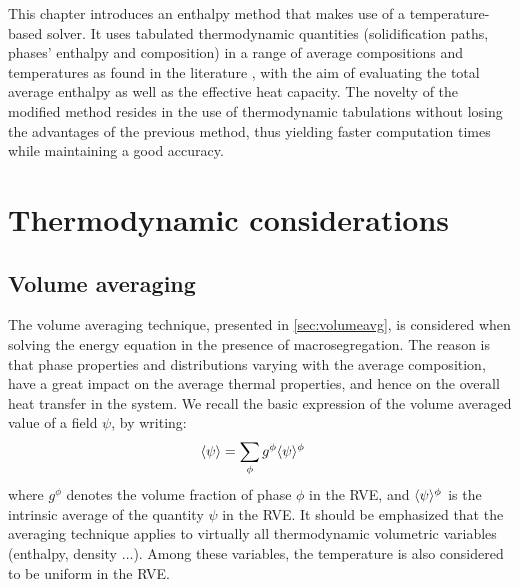 This chapter introduces an enthalpy method that makes use of a temperature-based solver. 
It uses tabulated thermodynamic quantities (solidification paths, phases' enthalpy  and composition) 
in a range of average compositions and temperatures as found in the literature 
\citep{dore_modelling_2000,thuinet_prediction_2004,du_modeling_2007}, 
with the aim of evaluating the total average enthalpy as well as the effective heat capacity. 
The novelty of the modified method resides in the use of thermodynamic tabulations without losing 
the advantages of the previous method, thus yielding faster computation times while maintaining a 
good accuracy.


\section{Thermodynamic considerations}

\subsection{Volume averaging} 

The volume averaging technique, presented in \cref{sec:volumeavg}, is considered
when solving the energy equation in the presence of macrosegregation. The reason is that phase
properties and distributions varying with the average composition, have a great impact on the average thermal properties,
and hence on the overall heat transfer in the system. We recall the basic expression of the volume averaged value of a field $\psi$, by writing:
\begin{align}
\label{eq:volume_average_psi}
& \langle \psi \rangle = \sum_\phi {g^{\phi}}  \langle \psi \rangle^{\phi}
\end{align}
where $g^\phi$ denotes the volume fraction of phase $\phi$ in the RVE, and $\langle \psi \rangle^\phi$ is the intrinsic average of the quantity $\psi$ in the RVE. 
It should be emphasized that the averaging technique applies to virtually all thermodynamic volumetric variables (enthalpy, density $\dots$). 
Among these variables, the temperature is also considered to be uniform in the RVE. 

